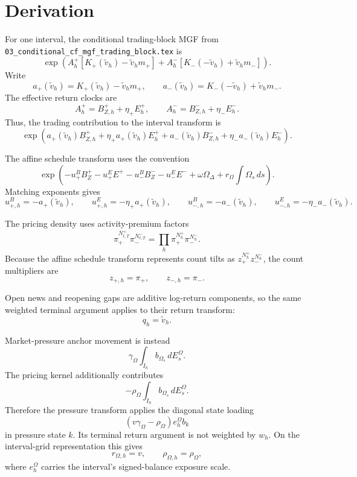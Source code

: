 \documentclass[11pt]{article}
\begin{document}
\section{Derivation}

For one interval, the conditional trading-block MGF from
\texttt{03\_conditional\_cf\_mgf\_trading\_block.tex} is
\[
    \exp\!\left(
        A_h^+\left[K_+(\tilde v_h)-\tilde v_h m_+\right]
        +
        A_h^-\left[K_-(-\tilde v_h)+\tilde v_h m_-\right]
    \right).
\]
Write
\[
    a_+(\tilde v_h)=K_+(\tilde v_h)-\tilde v_h m_+,
    \qquad
    a_-(\tilde v_h)=K_-(-\tilde v_h)+\tilde v_h m_-.
\]
The effective return clocks are
\[
    A_h^+=B_{Z,h}^++\eta_+E_h^+,
    \qquad
    A_h^-=B_{Z,h}^-+\eta_-E_h^-.
\]
Thus, the trading contribution to the interval transform is
\[
    \exp\!\left(
a_+(\tilde v_h)B_{Z,h}^+
+\eta_+a_+(\tilde v_h)E_h^+
+a_-(\tilde v_h)B_{Z,h}^-
+\eta_-a_-(\tilde v_h)E_h^-
\right).
\]

The affine schedule transform uses the convention
\[
    \exp\!\left(
-u_+^B B_Z^+-u_+^E E^+
-u_-^B B_Z^--u_-^E E^-
+\omega\Omega_\Delta
+r_\Omega\int\Omega_s\,ds
\right).
\]
Matching exponents gives
\[
    u_{+,h}^B=-a_+(\tilde v_h),
    \qquad
    u_{+,h}^E=-\eta_+a_+(\tilde v_h),
    \qquad
    u_{-,h}^B=-a_-(\tilde v_h),
    \qquad
    u_{-,h}^E=-\eta_-a_-(\tilde v_h).
\]

The pricing density uses activity-premium factors
\[
    \pi_+^{N_{t,T}^+}\pi_-^{N_{t,T}^-}
    =
    \prod_h \pi_+^{N_h^+}\pi_-^{N_h^-}.
\]
Because the affine schedule transform represents count tilts as
\(z_+^{N_h^+}z_-^{N_h^-}\), the count multipliers are
\[
    z_{+,h}=\pi_+,
    \qquad
    z_{-,h}=\pi_-.
\]

Open news and reopening gaps are additive log-return components, so the same
weighted terminal argument applies to their return transform:
\[
    q_h=\tilde v_h.
\]

Market-pressure anchor movement is instead
\[
    \gamma_\Omega\int_{I_h} b_{\Omega_s}\,dE_s^\Omega.
\]
The pricing kernel additionally contributes
\[
    -\rho_\Omega\int_{I_h} b_{\Omega_s}\,dE_s^\Omega.
\]
Therefore the pressure transform applies the diagonal state loading
\[
    (v\gamma_\Omega-\rho_\Omega)e_h^\Omega b_k
\]
in pressure state \(k\). Its terminal return argument is not weighted by
\(w_h\). On the interval-grid representation this gives
\[
    r_{\Omega,h}=v,
    \qquad
    \rho_{\Omega,h}=\rho_\Omega,
\]
where \(e_h^\Omega\) carries the interval's signed-balance exposure scale.
\end{document}
